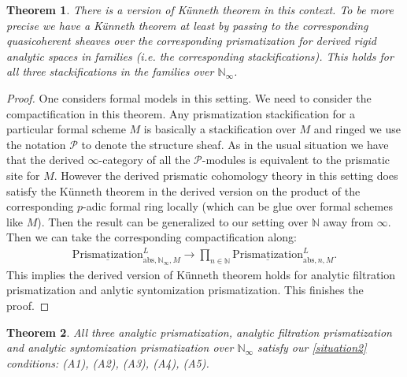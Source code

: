 \documentclass[12pt]{article}
\newtheorem{theorem}{Theorem}
\theoremstyle{definition}
\begin{document}
\begin{theorem}
There is a version of K\"unneth theorem in this context. To be more precise we have a K\"unneth theorem at least by passing to the corresponding quasicoherent sheaves over the corresponding prismatization for derived rigid analytic spaces in families (i.e. the corresponding stackifications). This holds for all three stackifications in the families over $\mathbb{N}_\infty$. 
\end{theorem}




\begin{proof}
One considers formal models in this setting. We need to consider the compactification in this theorem. Any prismatization stackification for a particular formal scheme $M$ is basically a stackification over $M$ and ringed we use the notation $\mathcal{P}$ to denote the structure sheaf. As in the usual situation we have that the derived $\infty$-category of all the $\mathcal{P}$-modules is equivalent to the prismatic site for $M$. However the derived prismatic cohomology theory in this setting does satisfy the K\"unneth theorem in the derived version on the product of the corresponding $p$-adic formal ring locally (which can be glue over formal schemes like $M$). Then the result can be generalized to our setting over $\mathbb{N}$ away from $\infty$. Then we can take the corresponding compactification along:
\begin{align}
{\underline{\mathrm{Prismatization}}}^L_{\mathrm{abs},\mathbb{N}_\infty,M}\rightarrow  \prod_{n\in \mathbb{N}} {\underline{\mathrm{Prismatization}}}^L_{\mathrm{abs},n,M}.
\end{align}
This implies the derived version of K\"unneth theorem holds for analytic filtration prismatization and anlytic syntomization prismatization. This finishes the proof.
\end{proof}

\begin{theorem}
All three analytic prismatization, analytic filtration prismatization and analytic syntomization prismatization over $\mathbb{N}_\infty$ satisfy our \cref{situation2} conditions: (A1), (A2), (A3), (A4), (A5).
\end{theorem}
\end{document}
